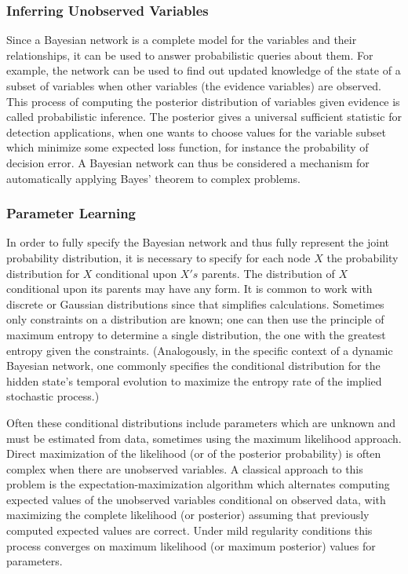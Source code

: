 \subsubsection{Inferring Unobserved Variables}
Since a Bayesian network is a complete model for the variables and their relationships, it can be used to answer probabilistic queries about them. For example, the network can be used to find out updated knowledge of the state of a subset of variables when other variables (the evidence variables) are observed. This process of computing the posterior distribution of variables given evidence is called probabilistic inference. The posterior gives a universal sufficient statistic for detection applications, when one wants to choose values for the variable subset which minimize some expected loss function, for instance the probability of decision error. A Bayesian network can thus be considered a mechanism for automatically applying Bayes' theorem to complex problems.


\subsubsection{Parameter Learning}
In order to fully specify the Bayesian network and thus fully represent the joint probability distribution, it is necessary to specify for each node $X$ the probability distribution for $X$ conditional upon $X's$ parents. The distribution of $X$ conditional upon its parents may have any form. It is common to work with discrete or Gaussian distributions since that simplifies calculations. Sometimes only constraints on a distribution are known; one can then use the principle of maximum entropy to determine a single distribution, the one with the greatest entropy given the constraints. (Analogously, in the specific context of a dynamic Bayesian network, one commonly specifies the conditional distribution for the hidden state's temporal evolution to maximize the entropy rate of the implied stochastic process.)

Often these conditional distributions include parameters which are unknown and must be estimated from data, sometimes using the maximum likelihood approach. Direct maximization of the likelihood (or of the posterior probability) is often complex when there are unobserved variables. A classical approach to this problem is the expectation-maximization algorithm which alternates computing expected values of the unobserved variables conditional on observed data, with maximizing the complete likelihood (or posterior) assuming that previously computed expected values are correct. Under mild regularity conditions this process converges on maximum likelihood (or maximum posterior) values for parameters.

